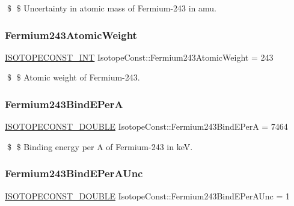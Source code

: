 \$ \$ Uncertainty in atomic mass of Fermium-\/243 in amu. \mbox{\label{group___isotope_const-_fermium-_fm243_gabc66c9983beb406b394bd6bac662cec8}} 
\subsubsection{\texorpdfstring{Fermium243\+Atomic\+Weight}{Fermium243AtomicWeight}}
{\footnotesize\ttfamily \mbox{\hyperlink{group___isotope_const-_macros_ga5f18360b3e99483a35c32d789e62621c}{I\+S\+O\+T\+O\+P\+E\+C\+O\+N\+S\+T\+\_\+\+I\+NT}} Isotope\+Const\+::\+Fermium243\+Atomic\+Weight = 243}

\$ \$ Atomic weight of Fermium-\/243. \mbox{\label{group___isotope_const-_fermium-_fm243_gaa8cf7ea66f2e0a8e2f84d405c0b154a3}} 
\subsubsection{\texorpdfstring{Fermium243\+Bind\+E\+PerA}{Fermium243BindEPerA}}
{\footnotesize\ttfamily \mbox{\hyperlink{group___isotope_const-_macros_ga8f45a7272ce02c0b4c65c44636ed719a}{I\+S\+O\+T\+O\+P\+E\+C\+O\+N\+S\+T\+\_\+\+D\+O\+U\+B\+LE}} Isotope\+Const\+::\+Fermium243\+Bind\+E\+PerA = 7464}

\$ \$ Binding energy per A of Fermium-\/243 in keV. \mbox{\label{group___isotope_const-_fermium-_fm243_ga87ded2236fa4bd6ae2368390dc46ec0b}} 
\subsubsection{\texorpdfstring{Fermium243\+Bind\+E\+Per\+A\+Unc}{Fermium243BindEPerAUnc}}
{\footnotesize\ttfamily \mbox{\hyperlink{group___isotope_const-_macros_ga8f45a7272ce02c0b4c65c44636ed719a}{I\+S\+O\+T\+O\+P\+E\+C\+O\+N\+S\+T\+\_\+\+D\+O\+U\+B\+LE}} Isotope\+Const\+::\+Fermium243\+Bind\+E\+Per\+A\+Unc = 1}

